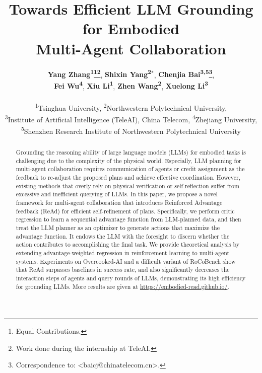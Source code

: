 \documentclass[11pt]{article}
\title{Towards Efficient LLM Grounding for Embodied \\Multi-Agent Collaboration}
\author{
 \textbf{Yang Zhang\textsuperscript{1}\thanks{Equal Contributions.}\thanks{Work done during the internship at TeleAI.}},
 \textbf{Shixin Yang\textsuperscript{2}$^*$},
 \textbf{Chenjia Bai\textsuperscript{3,5}\thanks{Correspondence to: <baicj@chinatelecom.cn>.}},
\\
 \textbf{Fei Wu\textsuperscript{4}},
 \textbf{Xiu Li\textsuperscript{1}},
 \textbf{Zhen Wang\textsuperscript{2}},
 \textbf{Xuelong Li\textsuperscript{3}}
\\
\\
 \textsuperscript{1}Tsinghua University,
 \textsuperscript{2}Northwestern Polytechnical University,
\\
 \textsuperscript{3}Institute of Artificial Intelligence (TeleAI), China Telecom,
 \textsuperscript{4}Zhejiang University,\\
 \textsuperscript{5}Shenzhen Research Institute of Northwestern Polytechnical University
\\
}
\theoremstyle{plain}
\theoremstyle{remark}
\begin{document}
\maketitle
\begin{abstract}
Grounding the reasoning ability of large language models (LLMs) for embodied tasks is challenging due to the complexity of the physical world. Especially, LLM planning for multi-agent collaboration requires communication of agents or credit assignment as the feedback to re-adjust the proposed plans and achieve effective coordination. However, existing methods that overly rely on physical verification or self-reflection suffer from excessive and inefficient querying of LLMs. In this paper, we propose a novel framework for multi-agent collaboration that introduces Reinforced Advantage feedback (ReAd) for efficient self-refinement of plans. Specifically, we perform critic regression to learn a sequential advantage function from LLM-planned data, and then treat the LLM planner as an optimizer to generate actions that maximize the advantage function. It endows the LLM with the foresight to discern whether the action contributes to accomplishing the final task. We provide theoretical analysis by extending advantage-weighted regression in reinforcement learning to multi-agent systems. Experiments on Overcooked-AI and a difficult variant of RoCoBench show that ReAd surpasses baselines in success rate, and also significantly decreases the interaction steps of agents and query rounds of LLMs, demonstrating its high efficiency for grounding LLMs. More results are given at \url{https://embodied-read.github.io/}.

\end{abstract}
\end{document}
